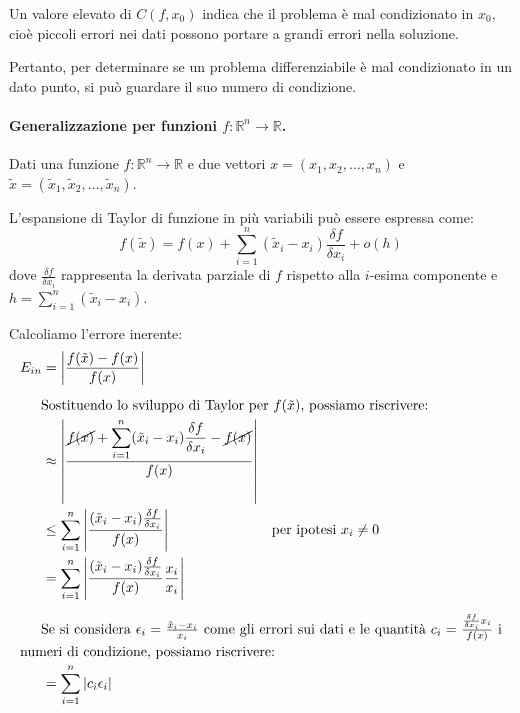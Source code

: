 \documentclass{article}
\begin{document}
Un valore elevato di $C(f, x_0)$ indica che il problema è mal condizionato in
$x_0$, cioè piccoli errori nei dati possono portare a grandi errori nella
soluzione.

Pertanto, per determinare se un problema differenziabile è mal condizionato in
un dato punto, si può guardare il suo numero di condizione.

\paragraph{Generalizzazione per funzioni $f:\mathbb{R}^n\rightarrow
\mathbb{R}$.} Dati una funzione $f:\mathbb{R}^n\rightarrow \mathbb{R}$ e due
vettori $x=(x_1,x_2,\ldots,x_n)$ e 
$\tilde{x}=(\tilde{x}_1,\tilde{x}_2,\ldots,\tilde{x}_n)$. 

L'espansione di
Taylor di funzione in più variabili può essere espressa come:
$$f(\tilde{x})=f(x)+\displaystyle\sum_{i=1}^{n}(\tilde{x}_i-x_i)\frac{\delta
f}{\delta x_i}+o(h)$$
dove $\frac{\delta f}{\delta x_i}$ rappresenta la derivata parziale di $f$
rispetto alla $i$-esima componente e
$h=\displaystyle\sum_{i=1}^{n}(\tilde{x}_i-x_i)$.

Calcoliamo l'errore inerente:
\begin{equation*}
   \begin{aligned}
       E_{in}&=\left\lvert \frac{f(\tilde{x})-f(x)}{f(x)}\right\rvert\\
       \alignedintertext{Sostituendo lo sviluppo di Taylor per $f(\tilde{x})$,
       possiamo riscrivere:}
             &\approx \left\lvert
                 \frac{\cancel{f(x)}+\displaystyle\sum_{i=1}^{n}(\tilde{x}_i-x_i)\frac{\delta
             f}{\delta x_i}-\cancel{f(x)}}{f(x)}\right\rvert \\ 
             &\leq \displaystyle\sum_{i=1}^{n}\left\lvert
             \frac{(\tilde{x}_i-x_i)\frac{\delta f}{\delta
x_i}}{f(x)}\right\rvert & \text{per ipotesi } x_i\neq 0\\ 
&= \displaystyle\sum_{i=1}^{n}\left\lvert \frac{(\tilde{x}_i-x_i)\frac{\delta
f}{\delta x_i}}{f(x)}\frac{x_i}{x_i}\right\rvert\\
\alignedintertext{Se si considera $\epsilon_i=\frac{\tilde{x}_i-x_i}{x_i}$
    come gli errori
sui dati e le quantità $c_i=\frac{\frac{\delta f}{\delta x_i}x_i}{f(x)}$ i numeri
di condizione, possiamo riscrivere:}
&= \displaystyle\sum_{i=1}^{n}\left\lvert c_i\epsilon_i\right\rvert
   \end{aligned} 
\end{equation*}
\end{document}
